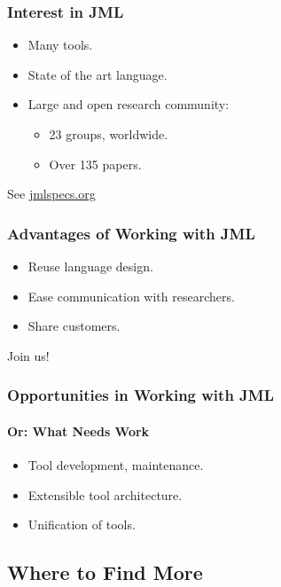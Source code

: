 \begin{frame}
\frametitle{Interest in JML}

\begin{itemize}
\item
Many tools.

\item
State of the art language.

\item
Large and open research community:
\begin{itemize}
\item
23 groups, worldwide.

\item
Over 135 papers.
\end{itemize}
\end{itemize}

See \href{http://www.jmlspecs.org}{jmlspecs.org}
\end{frame}

\begin{frame}[label=advantages]
\frametitle{Advantages of Working with JML}

\begin{itemize}
\item
Reuse language design.

\item
Ease communication with researchers.

\item
Share customers.
\end{itemize}

Join us!
\end{frame}

\begin{frame}[label=opportunities]
\frametitle{Opportunities in Working with JML}
\framesubtitle{Or: What Needs Work}

\begin{itemize}
\item
Tool development, maintenance.

\item
Extensible tool architecture.

\item
Unification of tools.
\end{itemize}
\end{frame}

\subsection[Finding More]{Where to Find More}

